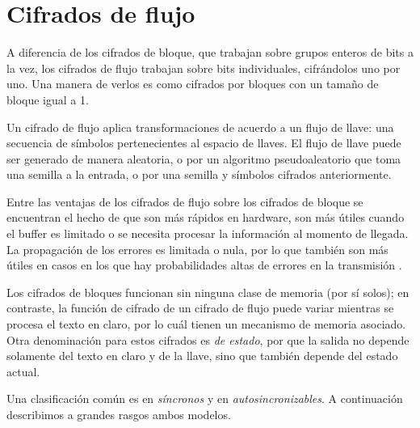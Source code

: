 %
%

\newpage
\section{Cifrados de flujo}

A diferencia de los cifrados de bloque, que trabajan sobre grupos enteros de
bits a la vez, los cifrados de flujo trabajan sobre bits individuales,
cifrándolos uno por uno. Una manera de verlos es como cifrados por bloques con
un tamaño de bloque igual a 1.

Un cifrado de flujo aplica transformaciones de acuerdo a un flujo de llave:
una secuencia de símbolos pertenecientes al espacio de llaves. El flujo de
llave puede ser generado de manera aleatoria, o por un algoritmo
pseudoaleatorio que toma una semilla a la entrada, o por una semilla y
símbolos cifrados anteriormente.

Entre las ventajas de los cifrados de flujo sobre los cifrados de bloque se
encuentran el hecho de que son más rápidos en hardware, son más útiles cuando
el buffer es limitado o se necesita procesar la información al momento de
llegada. La propagación de los errores es limitada o nula, por lo que también
son más útiles en casos en los que hay probabilidades altas de errores en la
transmisión \cite{menezes}.

Los cifrados de bloques funcionan sin ninguna clase de memoria (por sí solos);
en contraste, la función de cifrado de un cifrado de flujo puede variar
mientras se procesa el texto en claro, por lo cuál tienen un mecanismo de
memoria asociado. Otra denominación para estos cifrados es \textit{de estado},
por que la salida no depende solamente del texto en claro y de la llave, sino
que también depende del estado actual.

Una clasificación común es en \textit{síncronos} y
en \textit{autosincronizables}. A continuación describimos a grandes rasgos
ambos modelos.



